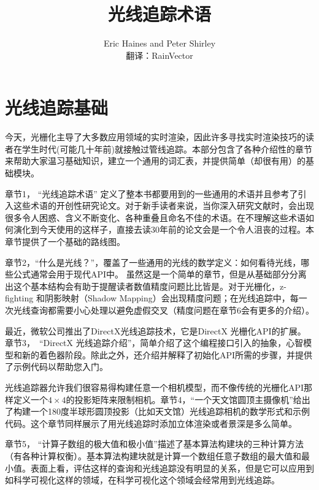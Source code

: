 \documentclass[12pt]{article}
\begin{document}
 
 
 
\title{光线追踪术语}%
\author{Eric Haines and Peter Shirley \\
	翻译：RainVector} 
 
\maketitle
\tableofcontents
 \section{光线追踪基础}
今天，光栅化主导了大多数应用领域的实时渲染，因此许多寻找实时渲染技巧的读者在学生时代(可能几十年前)就接触过管线追踪。本部分包含了各种介绍性的章节来帮助大家温习基础知识，建立一个通用的词汇表，并提供简单（却很有用）的基础模块。

章节\color{blue}1\color{black}， “光线追踪术语” 定义了整本书都要用到的一些通用的术语并且参考了引入这些术语的开创性研究论文。对于新手读者来说，当你深入研究文献时，会出现很多令人困惑、含义不断变化、各种重叠且命名不佳的术语。在不理解这些术语如何演化到今天使用的这样子，直接去读30年前的论文会是一个令人沮丧的过程。本章节提供了一个基础的路线图。

章节\color{blue}2\color{black}，“什么是光线？”，覆盖了一些通用的光线的数学定义：如何看待光线，哪些公式通常会用于现代API中。 虽然这是一个简单的章节，但是从基础部分分离出这个基本结构会有助于提醒读者数值精度问题比比皆是。对于光栅化，z-fighting 和阴影映射（Shadow Mapping）会出现精度问题；在光线追踪中，每一次光线查询都需要小心处理以避免虚假交叉（精度问题在章节6会有更多的介绍）。

最近，微软公司推出了DirectX光线追踪技术，它是DirectX 光栅化API的扩展。章节\color{blue}3\color{black}，\ “DirectX 光线追踪介绍”，简单介绍了这个编程接口引入的抽象，心智模型和新的着色器阶段。除此之外，还介绍并解释了初始化API所需的步骤，并提供了示例代码以帮助您入门。

光线追踪器允许我们很容易得构建任意一个相机模型，而不像传统的光栅化API那样定义一个$4\times 4$的投影矩阵来限制相机。章节\color{blue}4\color{black}，“一个天文馆圆顶主摄像机”给出了构建一个180度半球形圆顶投影（比如天文馆）光线追踪相机的数学形式和示例代码。这个章节同样展示了用光线追踪时添加立体渲染或者景深是多么简单。

章节\color{blue}5\color{black}， “计算子数组的极大值和极小值”描述了基本算法构建块的三种计算方法（有各种计算权衡）。基本算法构建块就是计算一个数组任意子数组的最大值和最小值。表面上看，评估这样的查询和光线追踪没有明显的关系，但是它可以应用到如科学可视化这样的领域，在科学可视化这个领域会经常用到光线追踪。
\end{document}
